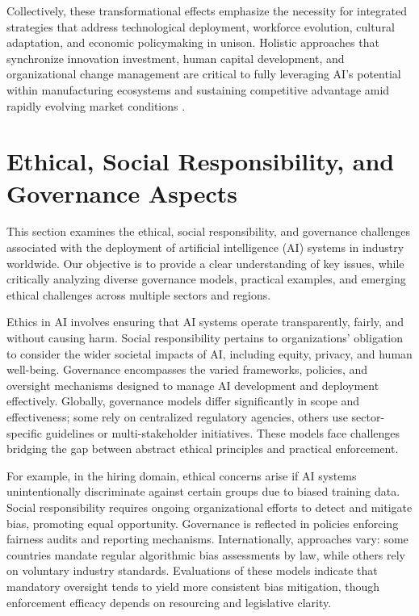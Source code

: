 \documentclass[sigconf]{acmart}
\begin{document}
Collectively, these transformational effects emphasize the necessity for integrated strategies that address technological deployment, workforce evolution, cultural adaptation, and economic policymaking in unison. Holistic approaches that synchronize innovation investment, human capital development, and organizational change management are critical to fully leveraging AI’s potential within manufacturing ecosystems and sustaining competitive advantage amid rapidly evolving market conditions \cite{ref19,ref36,ref38}.

\section{Ethical, Social Responsibility, and Governance Aspects}

This section examines the ethical, social responsibility, and governance challenges associated with the deployment of artificial intelligence (AI) systems in industry worldwide. Our objective is to provide a clear understanding of key issues, while critically analyzing diverse governance models, practical examples, and emerging ethical challenges across multiple sectors and regions.

Ethics in AI involves ensuring that AI systems operate transparently, fairly, and without causing harm. Social responsibility pertains to organizations' obligation to consider the wider societal impacts of AI, including equity, privacy, and human well-being. Governance encompasses the varied frameworks, policies, and oversight mechanisms designed to manage AI development and deployment effectively. Globally, governance models differ significantly in scope and effectiveness; some rely on centralized regulatory agencies, others use sector-specific guidelines or multi-stakeholder initiatives. These models face challenges bridging the gap between abstract ethical principles and practical enforcement.

For example, in the hiring domain, ethical concerns arise if AI systems unintentionally discriminate against certain groups due to biased training data. Social responsibility requires ongoing organizational efforts to detect and mitigate bias, promoting equal opportunity. Governance is reflected in policies enforcing fairness audits and reporting mechanisms. Internationally, approaches vary: some countries mandate regular algorithmic bias assessments by law, while others rely on voluntary industry standards. Evaluations of these models indicate that mandatory oversight tends to yield more consistent bias mitigation, though enforcement efficacy depends on resourcing and legislative clarity.
\end{document}
